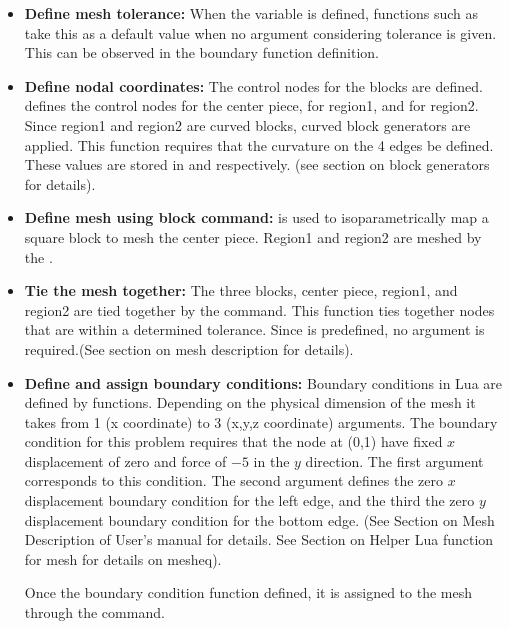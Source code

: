 \begin{itemize}
  \item{\textbf{Define mesh tolerance:}}
  When the variable  is defined, functions such as 
   take this as a default
  value when no argument considering tolerance is given. This can be 
  observed in the boundary function definition.

  \item{\textbf{Define nodal coordinates:}}
  The control nodes for the blocks are defined.  defines the 
  control nodes for the center piece,  for region1, and 
   for region2. Since region1 and region2 are curved blocks,
  curved block generators are applied. This function requires that
  the curvature on the 4 edges be defined. These values are stored in
   and  respectively. (see section on block
  generators for details).

  \item{\textbf{Define mesh using block command:}}
   is used to isoparametrically map a square
  block to mesh the center piece. Region1 and region2 are meshed by
  the .

  \item{\textbf{Tie the mesh together:}}
  The three blocks, center piece, region1, and region2 are tied
  together by the  command. This function ties together 
  nodes that are within a determined tolerance. Since  
  is predefined, no argument is required.(See section on mesh
  description for details).

  \item{\textbf{Define and assign boundary conditions:}}  
  Boundary conditions in Lua are defined by functions. Depending
  on the physical dimension of the mesh it takes from 1 (x coordinate)
  to 3 (x,y,z coordinate) arguments. The boundary condition for
  this problem requires that the node at (0,1) have fixed $x$ displacement
  of zero and force of $-5$ in the $y$ direction. The first 
  argument corresponds to this condition. The second  argument
  defines the zero $x$ displacement boundary condition for the left edge,
  and the third the zero $y$ displacement boundary condition for the 
  bottom edge. (See Section on Mesh Description of
  User's manual for details. See Section on Helper Lua function for
  mesh for details on mesheq).

  Once the boundary condition function defined, it is assigned 
  to the mesh through the  command.

\end{itemize}

